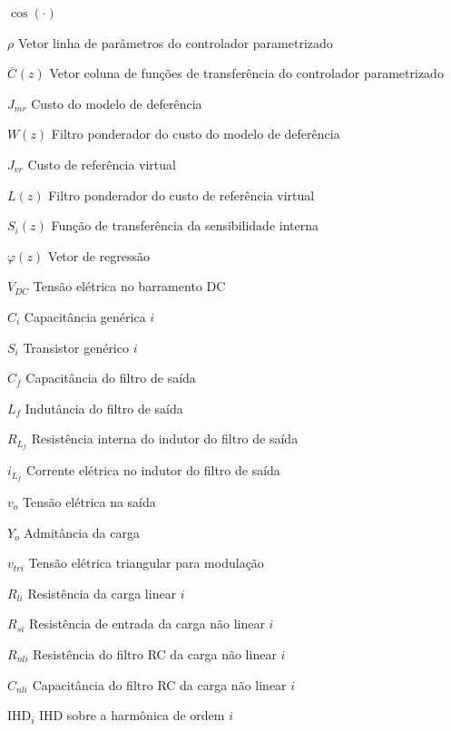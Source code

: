 \documentclass[repeatfields,oneside,overleaf]{tcc}
\newcommand{\myoC}[2][]{ \overline{C_{#1}} \left( #2 \right) }
\begin{document}
\begin{listofsymbols}{$ \cos(\cdot) $}
    \item[$ \rho $] Vetor linha de parâmetros do controlador parametrizado
    \item[$ \myoC{z} $] Vetor coluna de funções de transferência do controlador parametrizado

    \item[$ J_{mr} $] Custo do modelo de deferência
    \item[$ W(z) $] Filtro ponderador do custo do modelo de deferência

    \item[$ J_{vr} $] Custo de referência virtual
    \item[$ L(z) $] Filtro ponderador do custo de referência virtual

    \item[$ S_i(z) $] Função de transferência da sensibilidade interna

    \item[$ \varphi(z) $] Vetor de regressão


    \item[$ V_{DC} $] Tensão elétrica no barramento DC

    \item[$ C_i $] Capacitância genérica $i$
    \item[$ S_i $] Transistor genérico $i$

    \item[$ C_f $] Capacitância do filtro de saída
    \item[$ L_f $] Indutância do filtro de saída
    \item[$ R_{L_f} $] Resistência interna do indutor do filtro de saída

    \item[$ i_{L_f} $] Corrente elétrica no indutor do filtro de saída
    \item[$ v_o $] Tensão elétrica na saída

    \item[$ Y_o $] Admitância da carga

    \item[$ v_{tri} $] Tensão elétrica triangular para modulação

    \item[$ R_{li} $] Resistência da carga linear $i$

    \item[$ R_{si} $] Resistência de entrada da carga não linear $i$
    \item[$ R_{nli} $] Resistência do filtro RC da carga não linear $i$
    \item[$ C_{nli} $] Capacitância do filtro RC da carga não linear $i$


    \item[IHD\textsubscript{$i$}] IHD sobre a harmônica de ordem $i$

\end{listofsymbols}
\end{document}
